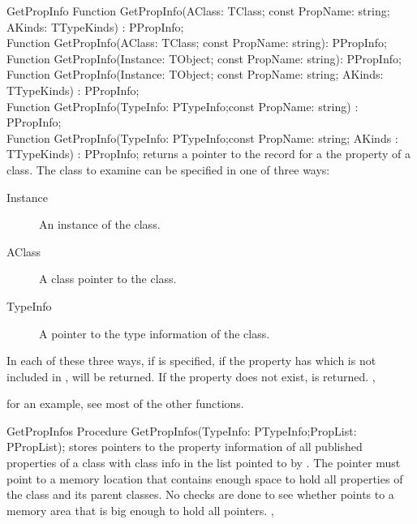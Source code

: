 
\begin{function}{GetPropInfo}
\Declaration
Function GetPropInfo(AClass: TClass; const PropName: string; AKinds: TTypeKinds) : PPropInfo;\\
Function GetPropInfo(AClass: TClass; const PropName: string): PPropInfo;\\
Function GetPropInfo(Instance: TObject; const PropName: string): PPropInfo;\\
Function GetPropInfo(Instance: TObject; const PropName: string; AKinds: TTypeKinds) : PPropInfo;\\
Function GetPropInfo(TypeInfo: PTypeInfo;const PropName: string) : PPropInfo;\\
Function GetPropInfo(TypeInfo: PTypeInfo;const PropName: string; AKinds : TTypeKinds) : PPropInfo;
\Description
{} returns a pointer to the  record for a the 
 property of a class. The class to examine can be specified 
in one of three ways:
\begin{description}
\item[Instance] An instance of the class.
\item[AClass] A class pointer to the class.
\item[TypeInfo] A pointer to the type information of the class.
\end{description}
In each of these three ways, if  is specified, if the property 
has  which is not included in ,  will be
returned.
\Errors
If the property  does not exist,  is returned.
\SeeAlso
{},
\end{function}

for an example, see most of the other functions.


\begin{procedure}{GetPropInfos}
\Declaration
Procedure GetPropInfos(TypeInfo: PTypeInfo;PropList: PPropList);
\Description
{} stores pointers to the property information of all published
properties of a class with class info  in the list pointed to by
. The  pointer must point to a memory location that
contains enough space to hold all properties of the class and its parent classes.
\Errors
No checks are done to see whether  points to a memory area that 
is big enough to hold all pointers.
\SeeAlso
{},
\end{procedure}

